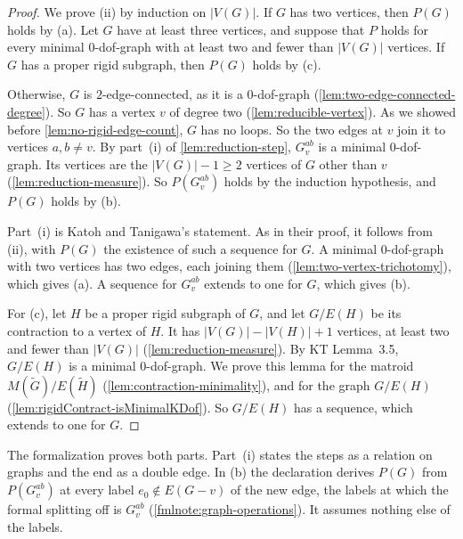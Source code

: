 \begin{proof}
  \leanok
  We prove (ii) by induction on $|V(G)|$. If $G$ has two vertices, then
  $P(G)$ holds by (a). Let $G$ have at least three vertices, and suppose
  that $P$ holds for every minimal $0$-dof-graph with at least two and
  fewer than $|V(G)|$ vertices. If $G$ has a proper rigid subgraph, then
  $P(G)$ holds by (c).

  Otherwise, $G$ is $2$-edge-connected, as it is a $0$-dof-graph
  (\cref{lem:two-edge-connected-degree}). So $G$ has a vertex $v$ of
  degree two (\cref{lem:reducible-vertex}). As we showed before
  \cref{lem:no-rigid-edge-count}, $G$ has no loops. So the two edges at
  $v$ join it to vertices $a, b \neq v$. By part~(i) of
  \cref{lem:reduction-step}, $G_v^{ab}$ is a minimal $0$-dof-graph. Its
  vertices are the $|V(G)| - 1 \ge 2$ vertices of $G$ other than $v$
  (\cref{lem:reduction-measure}). So $P(G_v^{ab})$ holds by the induction
  hypothesis, and $P(G)$ holds by (b).

  Part~(i) is Katoh and Tanigawa's statement. As in their proof, it
  follows from (ii), with $P(G)$ the existence of such a sequence for
  $G$. A minimal $0$-dof-graph with two vertices has two edges, each
  joining them (\cref{lem:two-vertex-trichotomy}), which gives (a). A
  sequence for $G_v^{ab}$ extends to one for $G$, which gives (b).

  For (c), let $H$ be a proper rigid subgraph of $G$, and let $G/E(H)$ be its
  contraction to a vertex of $H$. It has $|V(G)| - |V(H)| + 1$ vertices,
  at least two and fewer than $|V(G)|$ (\cref{lem:reduction-measure}).
  By KT Lemma~3.5, $G/E(H)$ is a minimal $0$-dof-graph. We prove this
  lemma for the matroid $M(\tilde G)/E(\tilde H)$
  (\cref{lem:contraction-minimality}), and for the graph $G/E(H)$
  (\cref{lem:rigidContract-isMinimalKDof}). So $G/E(H)$ has a sequence,
  which extends to one for $G$.
\end{proof}
\begin{fmlnote}
  The formalization proves both parts. Part~(i) states the steps as a
  relation on graphs and the end as a double edge. In (b) the declaration
  derives $P(G)$ from $P(G_v^{ab})$ at every label $e_0 \notin E(G - v)$
  of the new edge, the labels at which the formal splitting off is
  $G_v^{ab}$ (\cref{fmlnote:graph-operations}).
  It assumes nothing else of the labels.
\end{fmlnote}

